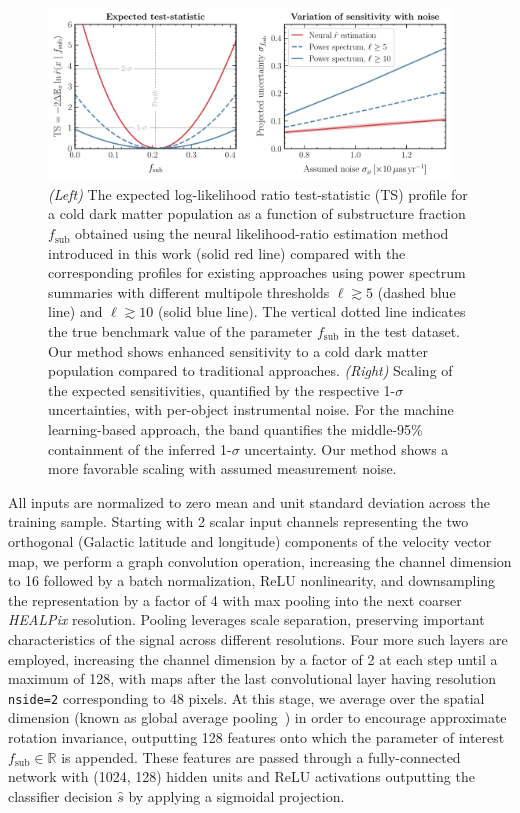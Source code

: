\documentclass[twocolumn]{aastex631}
\newcommand{\package}[1]{\textsl{#1}\xspace}
\newcommand{\healpix}{\package{HEALPix}}
\begin{document}
\begin{figure}[!htbp]
\centering
\includegraphics[width=0.95\textwidth]{results}
\caption{\emph{(Left)} The expected log-likelihood ratio test-statistic (TS) profile for a cold dark matter population as a function of substructure fraction $f_\mathrm{sub}$ obtained using the neural likelihood-ratio estimation method introduced in this work (solid red line) compared with the corresponding profiles for existing approaches using power spectrum summaries with different multipole thresholds $\ell \gtrsim 5$ (dashed blue line) and $\ell \gtrsim 10$ (solid blue line). The vertical dotted line indicates the true benchmark value of the parameter $f_\mathrm{sub}$ in the test dataset. Our method shows enhanced sensitivity to a cold dark matter population compared to traditional approaches. \emph{(Right)} Scaling of the expected sensitivities, quantified by the respective 1-$\sigma$ uncertainties, with per-object instrumental noise. For the machine learning-based approach, the band quantifies the middle-95\% containment of the inferred 1-$\sigma$ uncertainty. Our method shows a more favorable scaling with assumed measurement noise.}
\label{fig:experiment}
\end{figure}

All inputs are normalized to zero mean and unit standard deviation across the training sample. Starting with 2 scalar input channels representing the two orthogonal (Galactic latitude and longitude) components of the velocity vector map, we perform a graph convolution operation, increasing the channel dimension to 16 followed by a batch normalization, ReLU nonlinearity, and downsampling the representation by a factor of 4 with max pooling into the next coarser \healpix resolution. Pooling leverages scale separation, preserving important characteristics of the signal across different resolutions. 
Four more such layers are employed, increasing the channel dimension by a factor of 2 at each step until a maximum of 128, with maps after the last convolutional layer having resolution \texttt{nside=2} corresponding to 48 pixels. At this stage, we average over the spatial dimension (known as global average pooling~\citep{lin2014network}) in order to encourage approximate rotation invariance, outputting 128 features onto which the parameter of interest {$f_\mathrm{sub}\in\mathbb R$} is appended. These features are passed through a fully-connected network with (1024, 128) hidden units and ReLU activations outputting the classifier decision $\hat s$ by applying a sigmoidal projection.
\end{document}
